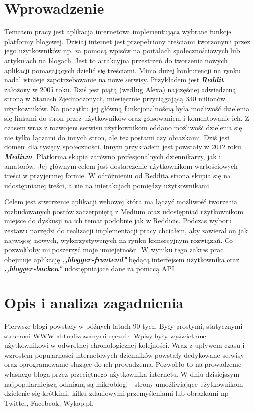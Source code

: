 \documentclass[declaration,shortabstract]{iithesis}
\author         {Oskar Sobczyk}
\date          {}                     %
\begin{document}

\chapter{Wprowadzenie}
Tematem pracy jest aplikacja internetowa implementująca wybrane funkcje platformy blogowej. {\color{red}Dzisiaj internet jest przepełniony treściami tworzonymi przez jego użytkowników np. za pomocą wpisów na portalach społecznościowych lub artykułach na blogach. Jest to atrakcyjna przestrzeń do tworzenia nowych aplikacji pomagających dzielić się treściami. Mimo dużej konkurencji na rynku nadal istnieje zapotrzebowanie na nowe serwisy. Przykładem jest}  \textit{\textbf{Reddit}} założony w 2005 roku. Dziś jest piątą (według Alexa) najczęściej odwiedzaną stroną w Stanach Zjednoczonych, miesięcznie przyciągającą 330 milionów użytkowników. Na początku jej główną funkcjonalnością była możliwość dzielenia się linkami do stron przez użytkowników oraz głosowaniem i komentowanie ich. Z czasem wraz z rozwojem serwisu użytkownikom oddano możliwość dzielenia się nie tylko łączami do innych stron, ale też postami czy obrazkami. Dziś jest domem dla tysięcy społeczności. Innym przykładem jest powstały w 2012 roku \textit{\textbf{Medium}}. Platforma skupia zarówno profesjonalnych dziennikarzy, jak i amatorów. Jej głównym celem jest dostarczenie użytkownikom wartościowych treści w przyjemnej formie. W odróżnieniu od Reddita strona skupia się na udostępnianej treści, a nie na interakcjach pomiędzy użytkownikami. 

{\color{red}Celem jest stworzenie aplikacji webowej która ma łączyć możliwość tworzenia rozbudowanych postów zaczerpniętą z Medium oraz udostępniać użytkownikom miejsce do dyskusji na ich temat podobnie jak w Reddicie.} Podczas wyboru zestawu narzędzi do realizacji implementacji pracy chciałem, aby zawierał on jak najwięcej nowych, wykorzystywanych na rynku komercyjnym rozwiązań. Co pozwoliłoby mi poszerzyć moje umiejętności. {\color{red} W wyniku tego zakres prac obejmuje aplikację \textbf{\textit{,,blogger-frontend"}} będącą interfejsem użytkownika oraz \textbf{\textit{,,blogger-backen"}} udostępniajace dane za pomocą API}

\chapter{Opis i analiza zagadnienia}

Pierwsze blogi powstały w późnych latach 90-tych. Były prostymi, statycznymi stronami WWW aktualizowanymi ręcznie. Wpisy były wyświetlane użytkownikowi w odwrotnej chronologicznej kolejności. Wraz z upływem czasu i wzrostem popularności internetowych dzienników powstały dedykowane serwisy oraz oprogramowanie służące do ich prowadzenia. Pozwoliło to na prowadzenie własnego bloga przez przeciętnego użytkownika internetu. W dniu dzisiejszym najpopularniejszą odmianą są mikroblogi - strony umożliwiające użytkownikom dzielenie się krótkimi, kilku zdaniowymi przemyśleniami lub obrazkami np. Twitter, Facebook, Wykop.pl.
\end{document}
